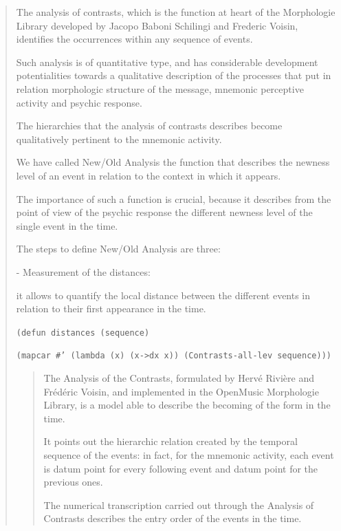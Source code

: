 \begin{quotation} 
\begin{slshape} 
\noindent The analysis of contrasts, which is the function at heart of the Morphologie Library developed by Jacopo Baboni Schilingi and Frederic Voisin, identifies the occurrences within any sequence of events.

\noindent Such analysis is of quantitative type, and has considerable development potentialities towards a qualitative description of the processes that put in relation morphologic structure of the message, mnemonic perceptive activity and psychic response.

\noindent The hierarchies that the analysis of contrasts describes become qualitatively pertinent to the mnemonic activity.

\noindent We have called New/Old Analysis the function that describes the newness level of an event in relation to the context in which it appears.

\noindent The importance of such a function is crucial, because it describes from the point of view of the psychic response the different newness level of the single event in the time.

\noindent The steps to define New/Old Analysis are three:

 - Measurement of the distances:

\pagebreak

\noindent it allows to quantify the local distance between the different events in relation to their first appearance in the time.
\end{slshape}

\noindent\texttt{\footnotesize (defun distances (sequence)}

\noindent\texttt{\footnotesize \quad  (mapcar \#' (lambda (x) (x->dx x)) (Contrasts-all-lev sequence)))}

\begin{quotation} 
\begin{slshape} 
\noindent The Analysis of the Contrasts, formulated by Herv\'e Rivi\`ere and Fr\'ed\'eric Voisin, and implemented in the OpenMusic Morphologie Library, is a model able to describe the becoming of the form in the time.

\noindent It points out the hierarchic relation created by the temporal sequence of the events: in fact, for the mnemonic activity, each event is datum point for every following event and datum point for the previous ones.

\noindent The numerical transcription carried out through the Analysis of Contrasts describes the entry order of the events in the time.


\end{slshape}
\end{quotation}
\end{quotation}
